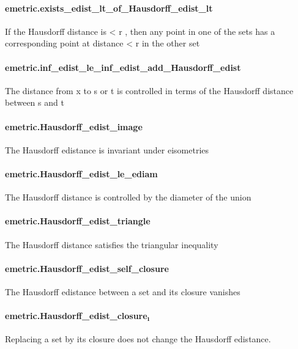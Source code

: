 \documentclass{article}
\begin{document}
\paragraph{emetric.exists\_edist\_lt\_of\_Hausdorff\_edist\_lt}
\par
If the Hausdorff distance is 
\colorbox[RGB]{253,246,227}{{{{\color[RGB]{181, 137, 0} < }}}{{{\color[RGB]{101, 123, 131} r }}}}, then any point in one of the sets has
a corresponding point at distance 
\colorbox[RGB]{253,246,227}{{{{\color[RGB]{181, 137, 0} < }}}{{{\color[RGB]{101, 123, 131} r }}}} in the other set
\paragraph{emetric.inf\_edist\_le\_inf\_edist\_add\_Hausdorff\_edist}
\par
The distance from 
\colorbox[RGB]{253,246,227}{{{{\color[RGB]{101, 123, 131} x }}}} to 
\colorbox[RGB]{253,246,227}{{{{\color[RGB]{101, 123, 131} s }}}}or 
\colorbox[RGB]{253,246,227}{{{{\color[RGB]{101, 123, 131} t }}}} is controlled in terms of the Hausdorff distance
between 
\colorbox[RGB]{253,246,227}{{{{\color[RGB]{101, 123, 131} s }}}} and 
\colorbox[RGB]{253,246,227}{{{{\color[RGB]{101, 123, 131} t }}}}\paragraph{emetric.Hausdorff\_edist\_image}
\par
The Hausdorff edistance is invariant under eisometries
\paragraph{emetric.Hausdorff\_edist\_le\_ediam}
\par
The Hausdorff distance is controlled by the diameter of the union
\paragraph{emetric.Hausdorff\_edist\_triangle}
\par
The Hausdorff distance satisfies the triangular inequality
\paragraph{emetric.Hausdorff\_edist\_self\_closure}
\par
The Hausdorff edistance between a set and its closure vanishes
\paragraph{emetric.Hausdorff\_edist\_closure₁}
\par
Replacing a set by its closure does not change the Hausdorff edistance.
\end{document}
